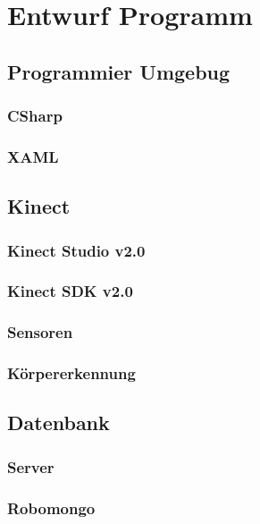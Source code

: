


\chapter{Entwurf Programm}

\section{Programmier Umgebug}
	\subsection{CSharp}
	\subsection{XAML}
\section{Kinect}
	\subsection{Kinect Studio v2.0} 
	\subsection{Kinect SDK v2.0 } 
	\subsection{Sensoren} 
	\subsection{Körpererkennung} 
\section{Datenbank}
	\subsection{Server}
	\subsection{Robomongo}




